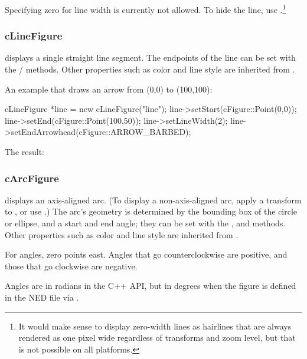 Specifying zero for line width is currently not allowed. To hide the line,
use .\footnote{It would make sense to display
zero-width lines as hairlines that are always rendered as one pixel wide
regardless of transforms and zoom level, but that is not possible on all
platforms.}


\subsubsection{cLineFigure}
\label{sec:graphics:linefigure}

 displays a single straight line segment. The endpoints
of the line can be set with the /
methods. Other properties such as color and line style are inherited from
.

An example that draws an arrow from (0,0) to (100,100):

\begin{cpp}
cLineFigure *line = new cLineFigure("line");
line->setStart(cFigure::Point(0,0));
line->setEnd(cFigure::Point(100,50));
line->setLineWidth(2);
line->setEndArrowhead(cFigure::ARROW_BARBED);
\end{cpp}

The result:

\begin{center}

\end{center}


\subsubsection{cArcFigure}
\label{sec:graphics:arcfigure}

 displays an axis-aligned arc. (To display a
non-axis-aligned arc, apply a transform to , or use
.) The arc's geometry is determined by the bounding box
of the circle or ellipse, and a start and end angle; they can be set with
the ,  and 
methods. Other properties such as color and line style are inherited from
.

For angles, zero points east. Angles that go counterclockwise are
positive, and those that go clockwise are negative.

\begin{note}
Angles are in radians in the C++ API, but in degrees when the figure is
defined in the NED file via .
\end{note}

